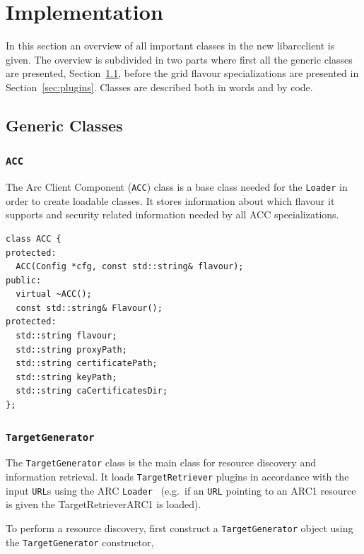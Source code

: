 \documentclass{book}
\newcommand{\libarcclient}{libarcclient}
\newcommand{\ACC}{\texttt{ACC}}
\newcommand{\Loader}{\texttt{Loader}}
\newcommand{\TargetGenerator}{\texttt{TargetGenerator}}
\newcommand{\TargetRetriever}{\texttt{TargetRetriever}}
\newcommand{\URL}{\texttt{URL}}
\begin{document}
\chapter{Implementation}
\label{sec:Implementation}

In this section an overview of all important classes in the new
{\libarcclient} is given. The overview is subdivided in two parts where
first all the generic classes are presented,
Section~\ref{sec:genclass}, before the grid flavour specializations
are presented in Section~\ref{sec:plugins}. Classes are described both
in words and by code.

\section{Generic Classes}
\label{sec:genclass}

\subsection{{\ACC}}

The Arc Client Component ({\ACC}) class is a base class needed for the
{\Loader} in order to create loadable classes. It stores information
about which flavour it supports and security related information
needed by all ACC specializations.

\begin{shaded}
\begin{verbatim}
class ACC {
protected:
  ACC(Config *cfg, const std::string& flavour);
public:
  virtual ~ACC();
  const std::string& Flavour();
protected:
  std::string flavour;
  std::string proxyPath;
  std::string certificatePath;
  std::string keyPath;
  std::string caCertificatesDir;
};
\end{verbatim}
\end{shaded}

\subsection{{\TargetGenerator}}

The {\TargetGenerator} class is the main class for resource discovery
and information retrieval. It loads {\TargetRetriever} plugins in
accordance with the input {\URL}s using the ARC {\Loader}~\cite{hed}
(e.g.\ if an {\URL} pointing to an ARC1 resource is given the
TargetRetrieverARC1 is loaded).

To perform a resource discovery, first construct a {\TargetGenerator}
object using the {\TargetGenerator} constructor,
\end{document}
